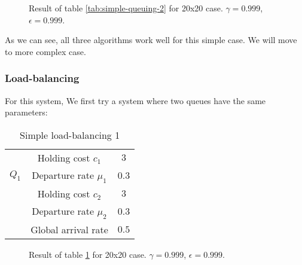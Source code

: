 \documentclass[
  a4paper, xcolor = usenames,dvipsnames]{article}
\theoremstyle{definition}
\theoremstyle{definition}
\theoremstyle{definition}
\theoremstyle{definition}
\theoremstyle{remark}
\begin{document}
\begin{figure}

{\centering {}

}

\caption{Result of table \ref{tab:simple-queuing-2} for 20x20 case. \(\gamma = 0.999\), \(\epsilon = 0.999\).}\label{fig:20x20-simple-queuing-2}
\end{figure}

As we can see, all three algorithms work well for this simple case. We will move to more complex case.

\hypertarget{load-balancing}{%
\subsubsection{Load-balancing}\label{load-balancing}}

For this system, We first try a system where two queues have the same parameters:

\begin{table}[!htbp]
\caption{Simple load-balancing 1}
\begin{center}
\begin{tabular}{c c c}
    \hline
    \multirow{3}{*}{$Q_{1}$} & Holding cost $c_{1}$ & $3$ \\
    & Departure rate $\mu_{1}$ & $0.3$ \\
    \cline{2-3}
    \multirow{3}{*}{$Q_{2}$} & Holding cost $c_{2}$ & $3$ \\
    & Departure rate $\mu_{2}$ & $0.3$ \\
    \cline{2-3}
    & Global arrival rate & $0.5$ \\    
    \hline
\end{tabular}
\end{center}
\label{tab:simple-lb-1}
\end{table}



\begin{figure}

{\centering {}

}

\caption{Result of table \ref{tab:simple-lb-1} for 20x20 case. \(\gamma = 0.999\), \(\epsilon = 0.999\).}\label{fig:20x20-simple-lb-1}
\end{figure}
\end{document}
